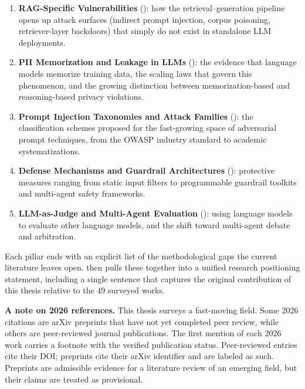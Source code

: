 \documentclass[11pt,a4paper]{report}
\begin{document}
\begin{enumerate}[leftmargin=2em, itemsep=3pt]
  \item \textbf{RAG-Specific Vulnerabilities} (): how the retrieval--generation pipeline opens up attack surfaces (indirect prompt injection, corpus poisoning, retriever-layer backdoors) that simply do not exist in standalone LLM deployments.
  \item \textbf{PII Memorization and Leakage in LLMs} (): the evidence that language models memorize training data, the scaling laws that govern this phenomenon, and the growing distinction between memorization-based and reasoning-based privacy violations.
  \item \textbf{Prompt Injection Taxonomies and Attack Families} (): the classification schemes proposed for the fast-growing space of adversarial prompt techniques, from the OWASP industry standard to academic systematizations.
  \item \textbf{Defense Mechanisms and Guardrail Architectures} (): protective measures ranging from static input filters to programmable guardrail toolkits and multi-agent safety frameworks.
  \item \textbf{LLM-as-Judge and Multi-Agent Evaluation} (): using language models to evaluate other language models, and the shift toward multi-agent debate and arbitration.
\end{enumerate}

Each pillar ends with an explicit list of the methodological gaps the current literature leaves open.  then pulls these together into a unified research positioning statement, including a single sentence that captures the original contribution of this thesis relative to the 49 surveyed works.

\begin{notebox}
\textbf{A note on 2026 references.} This thesis surveys a fast-moving field. Some 2026 citations are arXiv preprints that have not yet completed peer review, while others are peer-reviewed journal publications. The first mention of each 2026 work carries a footnote with the verified publication status. Peer-reviewed entries cite their DOI; preprints cite their arXiv identifier and are labeled as such. Preprints are admissible evidence for a literature review of an emerging field, but their claims are treated as provisional.
\end{notebox}
\end{document}
